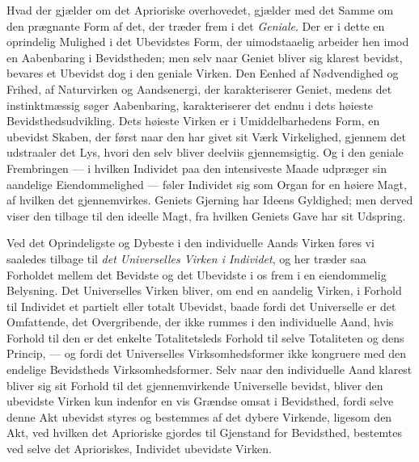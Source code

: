 \documentclass[12pt,a4paper,openany]{book}
\newcommand{\opage}[1]{\marginnote{\footnotesize\textit{[#1]}}}
\begin{document}
Hvad der gjælder om det Aprioriske overhovedet, gjælder
med det Samme om den prægnante Form af det, der træder
frem i det \emph{Geniale}. Der er i dette en oprindelig Mulighed
i det Ubevidstes Form, der uimodstaaelig arbeider hen
imod en Aabenbaring i Bevidstheden; men selv naar Geniet
bliver sig klarest bevidst, bevares et Ubevidst dog i den
geniale Virken. Den Eenhed af Nødvendighed og Frihed,
af Naturvirken og Aandsenergi, der karakteriserer Geniet,
medens det instinktmæssig søger Aabenbaring, karakteriserer
det endnu i dets høieste Bevidsthedsudvikling. Dets høieste
Virken er i Umiddelbarhedens Form, en ubevidst Skaben,
\opage{54}der først naar den har givet sit Værk Virkelighed, gjennem
det udstraaler det Lys, hvori den selv bliver deelviis gjennemsigtig.
Og i den geniale Frembringen --- i hvilken Individet
paa den intensiveste Maade udpræger sin aandelige Eiendommelighed
--- føler Individet sig som Organ for en høiere
Magt, af hvilken det gjennemvirkes. Geniets Gjerning har
Ideens Gyldighed; men derved viser den tilbage til den
ideelle Magt, fra hvilken Geniets Gave har sit Udspring.

Ved det Oprindeligste og Dybeste i den individuelle
Aands Virken føres vi saaledes tilbage til \emph{det Universelles
Virken i Individet}, og her træder saa Forholdet mellem
det Bevidste og det Ubevidste i os frem i en eiendommelig
Belysning. Det Universelles Virken bliver, om end en
aandelig Virken, i Forhold til Individet et partielt eller totalt
Ubevidst, baade fordi det Universelle er det Omfattende,
det Overgribende, der ikke rummes i den individuelle Aand,
hvis Forhold til den er det enkelte Totalitetsleds Forhold til
selve Totaliteten og dens Princip, --- og fordi det Universelles
Virksomhedsformer ikke kongruere med den endelige
Bevidstheds Virksomhedsformer. Selv naar den individuelle
Aand klarest bliver sig sit Forhold til det gjennemvirkende
Universelle bevidst, bliver den ubevidste Virken kun indenfor
en vis Grændse omsat i Bevidsthed, fordi selve denne
Akt ubevidst styres og bestemmes af det dybere Virkende,
ligesom den Akt, ved hvilken det Aprioriske gjordes til Gjenstand
for Bevidsthed, bestemtes ved selve det Aprioriskes, Individet
ubevidste Virken.
\end{document}
